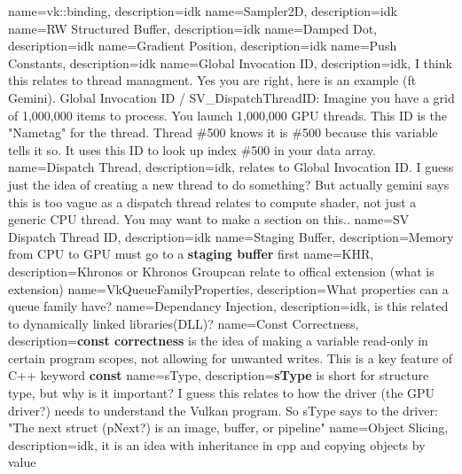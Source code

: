 \documentclass{article}
\begin{document}
{
name={vk::binding},
description={idk}
}
{
name={Sampler2D},
description={idk}
}
{
name={RW Structured Buffer},
description={idk}
}
{
name={Damped Dot},
description={idk}
}
{
name={Gradient Position},
description={idk}
}
{
name={Push Constants},
description={idk}
}
{
name={Global Invocation ID},
description={idk, I think this relates to thread managment. Yes you
  are right, here is an example (ft Gemini). Global Invocation ID /
  SV\_DispatchThreadID: Imagine you have a grid of 1,000,000 items to
  process. You launch 1,000,000 GPU threads. This ID is the "Nametag"
  for the thread. Thread \#500 knows it is \#500 because this variable
tells it so. It uses this ID to look up index \#500 in your data array.}
}
{
name={Dispatch Thread},
description={idk, relates to Global Invocation ID. I guess just the
  idea of creating a new thread to do something? But actually gemini
  says this is too vague as a dispatch thread relates to compute
shader, not just a generic CPU thread. You may want to make a section on this..}
}
{
name={SV Dispatch Thread ID},
description={idk}
}
{
name={Staging Buffer},
description={Memory from CPU to GPU must go to a \textbf{staging
buffer} first}
}
{
name={KHR},
description={Khronos or Khronos Group\textemdash can relate to offical
extension (what is extension)}
}
{
name={VkQueueFamilyProperties},
description={What properties can a queue family have?}
}
{
name={Dependancy Injection},
description={idk, is this related to dynamically linked libraries(DLL)?}
}
{
name={Const Correctness},
description={\textbf{const correctness} is the idea of making
  a variable read-only in certain program scopes, not allowing for
unwanted writes. This is a key feature of C++ keyword \textbf{const}}
}
{
name={sType},
description={\textbf{sType} is short for structure type, but why is
  it important? I guess this relates to how the driver (the GPU
  driver?) needs to understand the Vulkan program. So sType says to
the driver: "The next struct (pNext?) is an image, buffer, or pipeline"}
}
{
name={Object Slicing},
description={idk, it is an idea with inheritance in cpp and copying
objects by value}
}
\end{document}
